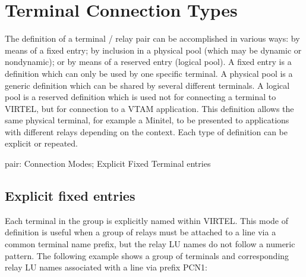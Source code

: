 \documentclass[letterpaper,10pt,english]{sphinxmanual}
\begin{document}
\section{Terminal Connection Types}
\label{\detokenize{connectivity_guide:terminal-connection-types}}\label{\detokenize{connectivity_guide:index-141}}
\sphinxAtStartPar
The definition of a terminal / relay pair can be accomplished in various ways: by means of a fixed entry; by inclusion in a physical pool (which may be dynamic or non\sphinxhyphen{}dynamic); or by means of a reserved entry (logical pool). A fixed entry is a definition which can only be used by one specific terminal. A physical pool is a generic definition which can be shared by several different terminals. A logical pool is a reserved definition which is used not for connecting a terminal to VIRTEL, but for connection to a VTAM application. This definition allows the same physical terminal, for example a Minitel, to be presented to applications with different relays depending on the context. Each type of definition can be explicit or repeated.
\begin{description}
\sphinxAtStartPar
pair: Connection Modes; Explicit Fixed Terminal entries

\end{description}


\subsection{Explicit fixed entries}
\label{\detokenize{connectivity_guide:explicit-fixed-entries}}
\sphinxAtStartPar
Each terminal in the group is explicitly named within VIRTEL. This mode of definition is useful when a group of relays must be attached to a line via a common terminal name prefix, but the relay LU names do not follow a numeric pattern. The following example shows a group of terminals and corresponding relay LU names associated with a line via prefix PCN1:
\end{document}
